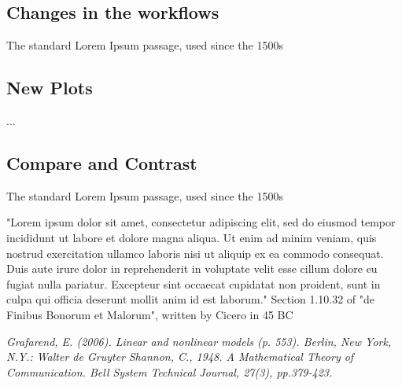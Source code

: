 \documentclass[11pt]{article}
\begin{document}
		\subsection*{Changes in the workflows}
			The standard Lorem Ipsum passage, used since the 1500s
		\subsection*{New Plots}
			...
		\subsection*{Compare and Contrast}
			The standard Lorem Ipsum passage, used since the 1500s
			
			"Lorem ipsum dolor sit amet, consectetur adipiscing elit, sed do eiusmod tempor incididunt ut labore et dolore magna aliqua. Ut enim ad minim veniam, quis nostrud exercitation ullamco laboris nisi ut aliquip ex ea commodo consequat. Duis aute irure dolor in reprehenderit in voluptate velit esse cillum dolore eu fugiat nulla pariatur. Excepteur sint occaecat cupidatat non proident, sunt in culpa qui officia deserunt mollit anim id est laborum."
			Section 1.10.32 of "de Finibus Bonorum et Malorum", written by Cicero in 45 BC
		
		 
		
	
	\pagebreak
	\begin{thebibliography}{1}	
		\textit{Grafarend, E. (2006). Linear and nonlinear models (p. 553). Berlin, New York, N.Y.: Walter de Gruyter}
		\textit{Shannon, C., 1948. A Mathematical Theory of Communication. Bell System Technical Journal, 27(3), pp.379-423.}
		
	\end{thebibliography}
\end{document}
